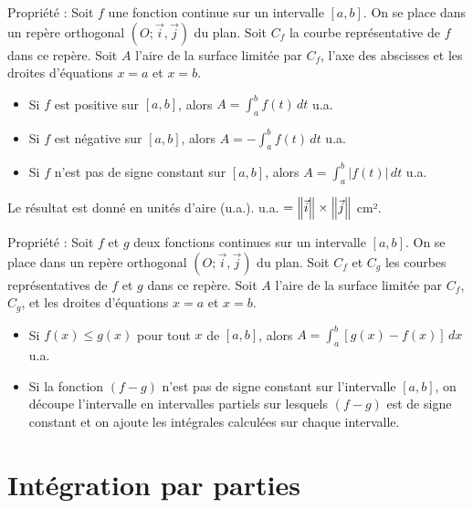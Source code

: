 \documentclass[11pt,a4paper]{article}
\begin{document}
\begin{boiteProp}{Propriété :}
    Soit $f$ une fonction continue sur un intervalle $[a,b]$.
    \newline
    On se place dans un repère orthogonal $(O;\vec{i},\vec{j})$ du plan. Soit $C_f$ la courbe représentative de $f$ dans ce repère.
    \newline
    Soit $A$ l'aire de la surface limitée par $C_f$, l'axe des abscisses et les droites d'équations $x=a$ et $x=b$.
    \newline
    \begin{itemize}
        \item Si $f$ est positive sur $[a,b]$, alors $A = \displaystyle \int_a^b f(t)\,dt$ u.a.
        \item Si $f$ est négative sur $[a,b]$, alors $A = -\displaystyle \int_a^b f(t)\,dt$ u.a.
        \item Si $f$ n'est pas de signe constant sur $[a,b]$, alors $A = \displaystyle \int_a^b |f(t)|\,dt$ u.a.
    \end{itemize}   
\end{boiteProp}

Le résultat est donné en unités d'aire (u.a.).
 u.a. $= \norm{\vec{i}} \times \norm{\vec{j}}$ cm².

\begin{boiteProp}{Propriété :}
    Soit $f$ et $g$ deux fonctions continues sur un intervalle $[a,b]$.
    \newline
    On se place dans un repère orthogonal $(O;\vec{i},\vec{j})$ du plan. Soit $C_f$ et $C_g$ les courbes représentatives de $f$ et $g$ dans ce repère.
    \newline
    Soit $A$ l'aire de la surface limitée par $C_f$, $C_g$, et les droites d'équations $x=a$ et $x=b$.
    \begin{itemize}
        \item Si $f(x) \leq g(x)$ pour tout $x$ de $[a,b]$, alors $A = \displaystyle \int_a^b [g(x) - f(x)]\,dx$ u.a.
        \item Si la fonction $(f-g)$ n'est pas de signe constant sur l'intervalle $[a,b]$, on découpe l'intervalle en intervalles partiels sur lesquels $(f-g)$ est de signe constant et on ajoute les intégrales calculées sur chaque intervalle.
    \end{itemize}
\end{boiteProp}

\section{Intégration par parties}
\end{document}
